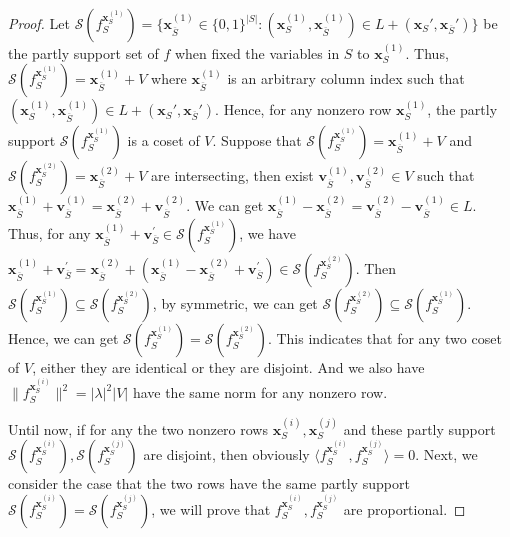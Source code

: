 \begin{proof}
    Let $\mathscr{S}(f_{S}^{\mathbf{x}_S^{(1)}})=\{\mathbf{x}_{\overline{S}}^{(1)}\in\{0,1\}^{|S|}:(\mathbf{x}_S^{(1)},\mathbf{x}_{\overline{S}}^{(1)})\in L+(\mathbf{x}_S',\mathbf{x}_{\overline{S}}')\}$ be the partly support set of $f$ when fixed the variables in $S$ to $\mathbf{x}_S^{(1)}$. Thus, $\mathscr{S}(f_{S}^{\mathbf{x}_S^{(1)}})= \mathbf{x}_{\overline{S}}^{(1)}+V$ where $\mathbf{x}_{\overline{S}}^{(1)}$ is an arbitrary column index such that $(\mathbf{x}_S^{(1)},\mathbf{x}_{\overline{S}}^{(1)})\in L+(\mathbf{x}_S',\mathbf{x}_{\overline{S}}')$. Hence, for any nonzero row $\mathbf{x}_S^{(1)}$, the partly support $\mathscr{S}(f_{S}^{\mathbf{x}_S^{(1)}})$ is a coset of $V$. Suppose that $\mathscr{S}(f_{S}^{\mathbf{x}_S^{(1)}})=\mathbf{x}_{\overline{S}}^{(1)}+V$ and $\mathscr{S}(f_{S}^{\mathbf{x}_S^{(2)}})=\mathbf{x}_{\overline{S}}^{(2)}+V$ are intersecting, then exist $\mathbf{v}_{\overline{S}}^{(1)},\mathbf{v}_{\overline{S}}^{(2)}\in V$ such that $\mathbf{x}_{\overline{S}}^{(1)}+\mathbf{v}_{\overline{S}}^{(1)}=\mathbf{x}_{\overline{S}}^{(2)}+\mathbf{v}_{\overline{S}}^{(2)}$. We can get $\mathbf{x}_{\overline{S}}^{(1)}-\mathbf{x}_{\overline{S}}^{(2)}=\mathbf{v}_{\overline{S}}^{(2)}-\mathbf{v}_{\overline{S}}^{(1)}\in L$. Thus, for any $\mathbf{x}_{\overline{S}}^{(1)}+\mathbf{v}_{\overline{S}}^{'}\in \mathscr{S}(f_{S}^{\mathbf{x}_S^{(1)}})$, we have $\mathbf{x}_{\overline{S}}^{(1)}+\mathbf{v}_{\overline{S}}^{'}=\mathbf{x}_{\overline{S}}^{(2)}+(\mathbf{x}_{\overline{S}}^{(1)}-\mathbf{x}_{\overline{S}}^{(2)}+\mathbf{v}_{\overline{S}}^{'})\in \mathscr{S}(f_{S}^{\mathbf{x}_S^{(2)}})$. Then $\mathscr{S}(f_{S}^{\mathbf{x}_S^{(1)}})\subseteq \mathscr{S}(f_{S}^{\mathbf{x}_S^{(2)}})$, by symmetric, we can get $\mathscr{S}(f_{S}^{\mathbf{x}_S^{(2)}})\subseteq \mathscr{S}(f_{S}^{\mathbf{x}_S^{(1)}})$. Hence, we can get $\mathscr{S}(f_{S}^{\mathbf{x}_S^{(1)}})= \mathscr{S}(f_{S}^{\mathbf{x}_S^{(2)}})$. This indicates that for any two coset of $V$, either they are identical or they are disjoint. And we also have $\|f_{S}^{\mathbf{x}_S^{(i)}}\|^2=|\lambda|^2|V|$ have the same norm for any nonzero row.

    Until now, if for any the two nonzero rows $\mathbf{x}_S^{(i)},\mathbf{x}_S^{(j)}$ and these partly support $\mathscr{S}(f_{S}^{\mathbf{x}_S^{(i)}}), \mathscr{S}(f_{S}^{\mathbf{x}_S^{(j)}})$ are disjoint, then obviously $\langle f_{S}^{\mathbf{x}_S^{(i)}},f_{S}^{\mathbf{x}_S^{(j)}}\rangle=0$. Next, we consider the case that the two rows have the same partly support $\mathscr{S}(f_{S}^{\mathbf{x}_S^{(i)}})=\mathscr{S}(f_{S}^{\mathbf{x}_S^{(j)}})$, we will prove that $f_{S}^{\mathbf{x}_S^{(i)}},f_{S}^{\mathbf{x}_S^{(j)}}$ are proportional.


\end{proof}
